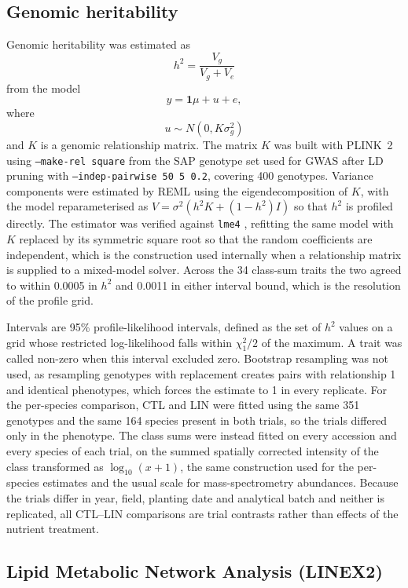 \documentclass[9pt,twocolumn,twoside]{rilabRxiv}
\begin{document}
\subsection*{Genomic heritability}
Genomic heritability was estimated as
\[
h^2 = \frac{V_g}{V_g + V_e}
\]
from the model
\[
y = \mathbf{1}\mu + u + e,
\]
where
\[
u \sim N(0, K\sigma_g^2)
\]
and \(K\) is a genomic relationship matrix. The matrix \(K\) was built with PLINK~2 using \texttt{--make-rel square} from the SAP genotype set used for GWAS after LD pruning with \texttt{--indep-pairwise 50 5 0.2}, covering 400 genotypes. Variance components were estimated by REML using the eigendecomposition of \(K\), with the model reparameterised as \(V = \sigma^2\!\left(h^2 K + (1-h^2) I\right)\) so that \(h^2\) is profiled directly. The estimator was verified against \texttt{lme4} \citep{Bates2015lme4}, refitting the same model with \(K\) replaced by its symmetric square root so that the random coefficients are independent, which is the construction used internally when a relationship matrix is supplied to a mixed-model solver. Across the 34 class-sum traits the two agreed to within 0.0005 in \(h^2\) and 0.0011 in either interval bound, which is the resolution of the profile grid.

Intervals are 95\% profile-likelihood intervals, defined as the set of \(h^2\) values on a grid whose restricted log-likelihood falls within \(\chi^2_1/2\) of the maximum. A trait was called non-zero when this interval excluded zero. Bootstrap resampling was not used, as resampling genotypes with replacement creates pairs with relationship 1 and identical phenotypes, which forces the estimate to 1 in every replicate. For the per-species comparison, CTL and LIN were fitted using the same 351 genotypes and the same 164 species present in both trials, so the trials differed only in the phenotype. The class sums were instead fitted on every accession and every species of each trial, on the summed spatially corrected intensity of the class transformed as \(\log_{10}(x+1)\), the same construction used for the per-species estimates and the usual scale for mass-spectrometry abundances. Because the trials differ in year, field, planting date and analytical batch and neither is replicated, all CTL--LIN comparisons are trial contrasts rather than effects of the nutrient treatment.


\subsection*{Lipid Metabolic Network Analysis (LINEX2)}
\end{document}
